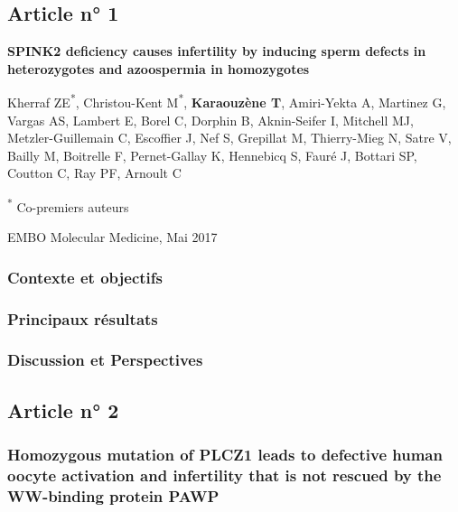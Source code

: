 \documentclass[12pt,twoside]{reedthesis}
\theoremstyle{definition}
\theoremstyle{definition}
\theoremstyle{remark}
\begin{document}
  \newpage
  
  \subsection{Article n° 1}\label{article-n-1}
  
  \textbf{SPINK2 deficiency causes infertility by inducing sperm defects
  in heterozygotes and azoospermia in homozygotes}
  
  Kherraf ZE\textsuperscript{*}, Christou-Kent M\textsuperscript{*},
  \textbf{Karaouzène T}, Amiri-Yekta A, Martinez G, Vargas AS, Lambert E,
  Borel C, Dorphin B, Aknin-Seifer I, Mitchell MJ, Metzler-Guillemain C,
  Escoffier J, Nef S, Grepillat M, Thierry-Mieg N, Satre V, Bailly M,
  Boitrelle F, Pernet-Gallay K, Hennebicq S, Fauré J, Bottari SP, Coutton
  C, Ray PF, Arnoult C
  
  \textsuperscript{*} Co-premiers auteurs
  
  EMBO Molecular Medicine, Mai 2017
  
  \newpage
  
  \subsubsection{Contexte et objectifs}\label{contexte-et-objectifs}
  
  \newpage
  
  
  
  \newpage
  
  \subsubsection{Principaux résultats}\label{principaux-resultats}
  
  \subsubsection{Discussion et
  Perspectives}\label{discussion-et-perspectives}
  
  \subsection{Article n° 2}\label{article-n-2}
  
  \subsubsection{Homozygous mutation of PLCZ1 leads to defective human
  oocyte activation and infertility that is not rescued by the WW-binding
  protein
  PAWP}\label{homozygous-mutation-of-plcz1-leads-to-defective-human-oocyte-activation-and-infertility-that-is-not-rescued-by-the-ww-binding-protein-pawp}
  
\end{document}
